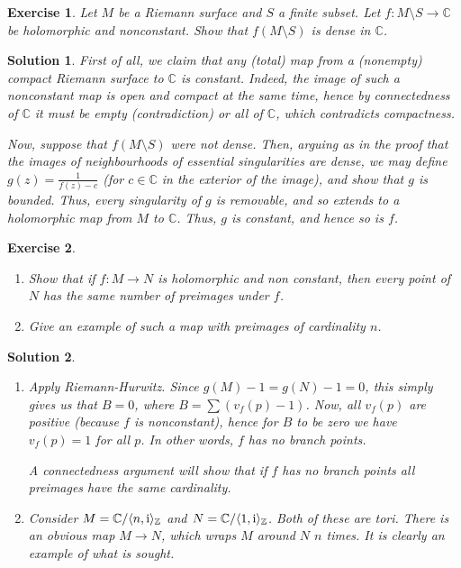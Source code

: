 \documentclass{article}
\newtheorem{ex}{Exercise}
\theoremstyle{nonumberplain}
\newtheorem{sol}{Solution}
\newcommand{\C}{\mathbb{C}}
\newcommand{\Z}{\mathbb{Z}}
\newcommand{\I}{\mathrm{i}}
\DeclarePairedDelimiter{\braket}{\langle}{\rangle}
\begin{document}
\begin{ex}
Let $M$ be a Riemann surface and $S$ a finite subset. Let $f \colon M \setminus S \to \C$ be holomorphic and nonconstant. Show that $f(M \setminus S)$ is dense in $\C$.
\end{ex}

\begin{sol}
First of all, we claim that any (total) map from a (nonempty) compact Riemann surface to $\C$ is constant. Indeed, the image of such a nonconstant map is open and compact at the same time, hence by connectedness of $\C$ it must be empty (contradiction) or all of $\C$, which contradicts compactness.

Now, suppose that $f(M \setminus S)$ were not dense. Then, arguing as in the proof that the images of neighbourhoods of essential singularities are dense, we may define $g(z) = \frac1{f(z) - c}$ (for $c \in \C$ in the exterior of the image), and show that $g$ is bounded. Thus, every singularity of $g$ is removable, and so extends to a holomorphic map from $M$ to $\C$. Thus, $g$ is constant, and hence so is $f$.
\end{sol}

\begin{ex}
\leavevmode
\begin{enumerate}
\item Show that if $f \colon M \to N$ is holomorphic and non constant, then every point of $N$ has the same number of preimages under $f$.
\item Give an example of such a map with preimages of cardinality $n$.
\end{enumerate}
\end{ex}

\begin{sol}
\leavevmode
\begin{enumerate}
\item Apply Riemann-Hurwitz. Since $g(M) - 1 = g(N) - 1 = 0$, this simply gives us that $B = 0$, where $B = \sum (v_f(p) - 1)$. Now, all $v_f(p)$ are positive (because $f$ is nonconstant), hence for $B$ to be zero we have $v_f(p) = 1$ for all $p$. In other words, $f$ has no branch points.

A connectedness argument will show that if $f$ has no branch points all preimages have the same cardinality.

\item Consider $M = \C / \braket{n, \I}_\Z$ and $N = \C / \braket{1,\I}_\Z$. Both of these are tori. There is an obvious map $M \to N$, which wraps $M$ around $N$ $n$ times. It is clearly an example of what is sought.
\end{enumerate}
\end{sol}
\end{document}
